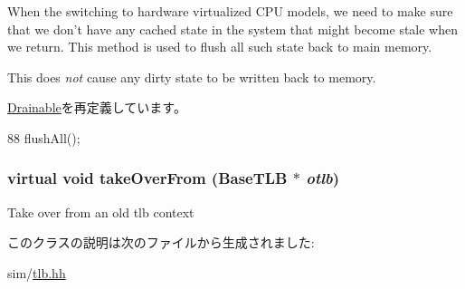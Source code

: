 When the switching to hardware virtualized CPU models, we need to make sure that we don't have any cached state in the system that might become stale when we return. This method is used to flush all such state back to main memory.

This does {\itshape not\/} cause any dirty state to be written back to memory. 

\hyperlink{classDrainable_a7f243f736712f56d8dd50cd21c77b9d1}{Drainable}を再定義しています。


\begin{DoxyCode}
88 { flushAll(); }
\end{DoxyCode}
\hypertarget{classBaseTLB_abb09460e26e2667f44dad5f0679835e5}{
\subsubsection[{takeOverFrom}]{\setlength{\rightskip}{0pt plus 5cm}virtual void takeOverFrom ({\bf BaseTLB} $\ast$ {\em otlb})}}
\label{classBaseTLB_abb09460e26e2667f44dad5f0679835e5}
Take over from an old tlb context 

このクラスの説明は次のファイルから生成されました:\begin{DoxyCompactItemize}
\item 
sim/\hyperlink{sim_2tlb_8hh}{tlb.hh}\end{DoxyCompactItemize}
